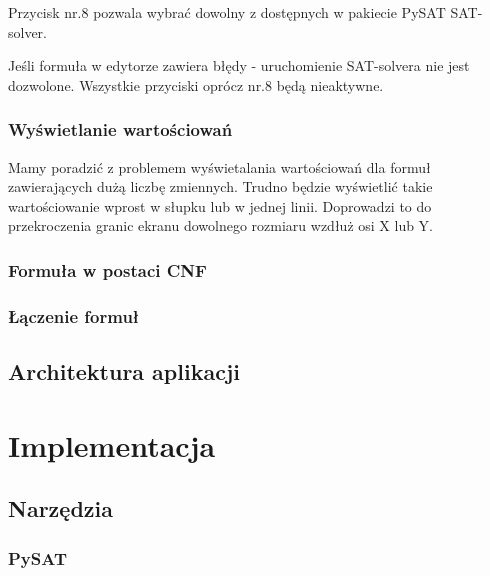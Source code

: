 \documentclass[a4paper,12pt,oneside]{book}
\theoremstyle{definition}
\begin{document}
Przycisk nr.8 pozwala wybrać dowolny z dostępnych w pakiecie PySAT SAT-solver.

Jeśli formuła w edytorze zawiera błędy - uruchomienie SAT-solvera nie jest dozwolone. Wszystkie przyciski oprócz nr.8 będą nieaktywne.

\subsection{Wyświetlanie wartościowań}

Mamy poradzić z problemem wyświetalania wartościowań dla formuł zawierających dużą liczbę zmiennych. Trudno będzie wyświetlić takie wartościowanie wprost w słupku lub w jednej linii. Doprowadzi to do przekroczenia granic ekranu dowolnego rozmiaru wzdłuż osi X lub Y. 

\lipsum[2]

\lipsum[3]

\subsection{Formuła w postaci CNF}

\lipsum[1]

\lipsum[2]

\lipsum[3]


\subsection{Łączenie formuł}

\lipsum[1]

\lipsum[2]

\lipsum[3]


\section{Architektura aplikacji}

\lipsum[1]

\lipsum[2]

\lipsum[3]

\chapter{Implementacja}

\section{Narzędzia}

\subsection{PySAT}
\end{document}
